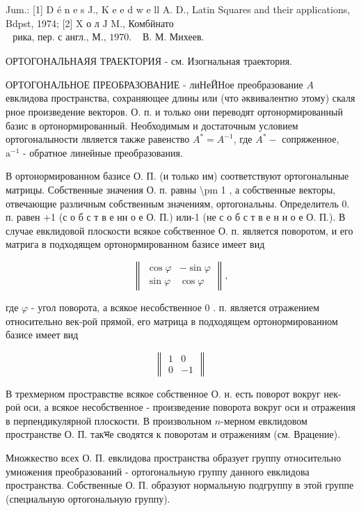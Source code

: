 \documentclass[10pt]{article}
\begin{document}
Jum.: [1] D é n e s J., K e e d w e ll A. D., Latin Squares and their applications, Bdpst, 1974; [2] X о л $\mathrm{J}$ M., Комбйнато$\begin{array}{ll}\text { рика, пер. с англ., М., } 1970 . & \text { В. М. Михеев. }\end{array}$

ОРТОГОНАЛЬНАЯЯ ТРАЕКТОРИЯ - см. Изогнальная траектория.

ОРТОГОНАЛЬНОЕ ПРЕОБРАЗОВАНИЕ - лиНеЙНое преобразование $A$ евклидова пространства, сохраняющее длины или (что әквивалентно этому) скаля рное произведение векторов. О. п. и только они переводят ортонормированный базис в ортонормированный. Необходимым и достаточным условием ортогоналыности лвляется также равенство $A^{*}=A^{-1}$, где $A^{*}-$ сопряженное, $\mathrm{a}^{-1}$ - обратное линейные преобразования.

В ортонормированном базисе О. П. (и только им) соответствуют ортогоналыные матрицы. Собственные значения О. п. равны \textbackslash pm 1 , а собственные векторы, отвечающие различным собственным значениям, ортогональны. Определитель 0. п. равен +1 (с о б с т в е нн о е О. П.) или-1 (не с о б с т в е н н о е О. П.). В случае евклидовой плоскости всякое собственное О. п. является поворотом, и его матрига в подходящем ортонормированном базисе имеет вид

\[
\left\|\begin{array}{lr}
\cos \varphi & -\sin \varphi \\
\sin \varphi & \cos \varphi
\end{array}\right\|,
\]

где $\varphi$ - угол поворота, а всякое несобственное 0 . п. является отражением относительно век-рой прямой, его матрица в подходящем ортонормированном базисе имеет вид

\[
\left\|\begin{array}{rr}
1 & 0 \\
0 & -1
\end{array}\right\|
\]

В трехмерном простравстве всякое собственное О. н. есть поворот вокруг нек-роӥ оси, а всякое несобственное - произведение поворота вокруг оси и отражения в перпендикулярной плоскости. В произвольном $n$-мерном евклидовом пространстве О. П. такभе сводятся к поворотам и отражениям (см. Врацение).

Множкество всех О. П. евклидова пространства образует группу относительно умножения преобразований - ортогональную группу данного евклидова пространства. Собственные О. П. образуют нормальную подгруппу в этой группе (специальную ортогональную группу).
\end{document}
